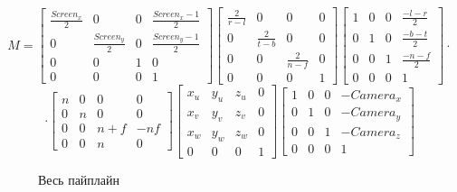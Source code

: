 \documentclass{article}
\begin{document}
$$ M = \begin{bmatrix}\frac{Screen_x}{2} & 0 & 0 & \frac{Screen_x - 1}{2} \\ 
					  0 & \frac{Screen_y}{2} & 0 & \frac{Screen_y - 1}{2} \\
					  0 & 0 & 1 & 0 \\
					  0 & 0 & 0 & 1\end{bmatrix}\begin{bmatrix}
					  \frac{2}{r - l} & 0 & 0 & 0 \\ 
					  0 & \frac{2}{t - b} & 0 & 0 \\
					  0 & 0 & \frac{2}{n - f} & 0 \\
					  0 & 0 & 0 & 1\end{bmatrix}\begin{bmatrix}
					  1 & 0 & 0 & \frac{-l - r}{2} \\ 
					  0 & 1 & 0 & \frac{-b - t}{2} \\
					  0 & 0 & 1 & \frac{-n - f}{2} \\
					  0 & 0 & 0 & 1\end{bmatrix} \cdot $$$$\cdot \begin{bmatrix}
					  n & 0 & 0 & 0 \\
					  0 & n & 0 & 0 \\
					  0 & 0 & n + f & -nf \\
					  0 & 0 & n & 0
					  \end{bmatrix}\begin{bmatrix}
					  x_u & y_u & z_u & 0 \\
					  x_v & y_v & z_v & 0 \\
					  x_w & y_w & z_w & 0 \\
					  0 & 0 & 0 & 1
					  \end{bmatrix}\begin{bmatrix}
					  1 & 0 & 0 & -Camera_x \\
					  0 & 1 & 0 & -Camera_y \\
					  0 & 0 & 1 & -Camera_z \\
					  0 & 0 & 0 & 1
					  \end{bmatrix}$$



\begin{center}
\begin{figure}[h]
\caption{Весь пайплайн}
\label{ris:image}
\end{figure}
\end{center}
\newpage
\end{document}
